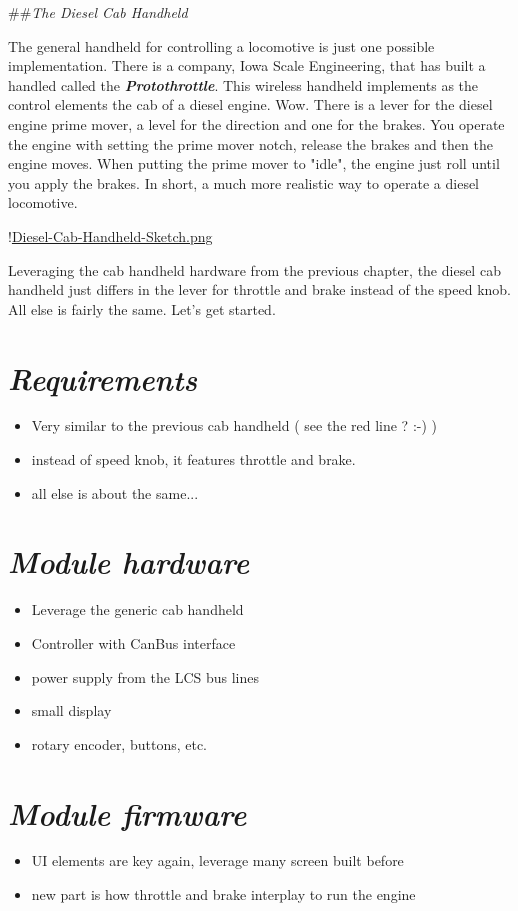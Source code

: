 ##\textit{The Diesel Cab Handheld}

The general handheld for controlling a locomotive is just one possible implementation. There is a company, Iowa Scale Engineering, that has built a handled called the \textbf{\textit{Protothrottle}}. This wireless handheld implements as the control elements the cab of a diesel engine. Wow. There is a lever for the diesel engine prime mover, a level for the direction and one for the brakes. You operate the engine with setting the prime mover notch, release the brakes and then the engine moves. When putting the prime mover to "idle", the engine just roll until you apply the brakes. In short, a much more realistic way to operate a diesel locomotive.

!\href{../Figures/Diesel-Cab-Handheld-Sketch.png }{Diesel-Cab-Handheld-Sketch.png}

Leveraging the cab handheld hardware from the previous chapter, the diesel cab handheld just differs in the lever for throttle and brake instead of the speed knob. All else is fairly the same. Let's get started.

\section{\textit{Requirements}}
\begin{itemize}
\item Very similar to the previous cab handheld ( see the red line ? :-) )
\item instead of speed knob, it features throttle and brake.
\item all else is about the same...
\end{itemize}

\section{\textit{Module hardware}}
\begin{itemize}
\item Leverage the generic cab handheld
\item Controller with CanBus interface
\item power supply from the LCS bus lines
\item small display
\item rotary encoder, buttons, etc.
\end{itemize}

\section{\textit{Module firmware}}
\begin{itemize}
\item UI elements are key again, leverage many screen built before
\item new part is how throttle and brake interplay to run the engine
\end{itemize}


